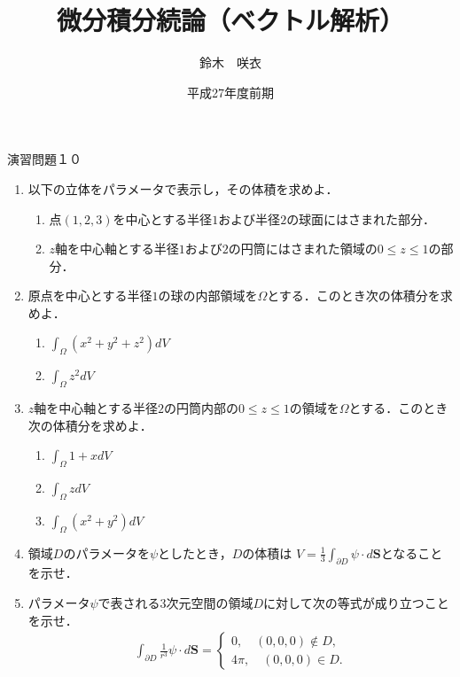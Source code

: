 \documentclass{jarticle}
\begin{document}
\title{微分積分続論（ベクトル解析）} 
\author{鈴木　咲衣}
\date{平成27年度前期}
\maketitle

\begin{center} {\Large 演習問題１０ } \end{center}
\begin{enumerate}
\item \cite[問題5.2]{koba}
以下の立体をパラメータで表示し，その体積を求めよ．
\begin{enumerate}
\item 点$(1,2,3)$を中心とする半径$1$および半径$2$の球面にはさまれた部分．
\item $z$軸を中心軸とする半径$1$および$2$の円筒にはさまれた領域の$0\leq z\leq 1$の部分．
\end{enumerate} 
\item \cite[問題5.5]{koba}
原点を中心とする半径$1$の球の内部領域を$\Omega$とする．このとき次の体積分を求めよ．
\begin{enumerate}
\item $\int_{\Omega} (x^{2}+y^{2}+z^{2}) dV$
\item $\int_{\Omega} z^{2} dV$
\end{enumerate} 
\item \cite[問題5.6]{koba}
$z$軸を中心軸とする半径$2$の円筒内部の$0\leq z\leq 1$の領域を$\Omega$とする．このとき次の体積分を求めよ．
\begin{enumerate}
\item $\int_{\Omega} 1+xdV$
\item $\int_{\Omega} zdV$
\item $\int_{\Omega} (x^{2}+y^{2})dV$
\end{enumerate} 
\item  \cite[問題8.10]{koba}
領域$D$のパラメータを$\psi$としたとき，$D$の体積は
$V=\frac{1}{3}\int_{\partial D} \psi \cdot d\bm S$となることを示せ．
\item \cite[章末問題8.4]{koba}パラメータ$\psi$で表される$3$次元空間の領域$D$に対して次の等式が成り立つことを示せ．
\begin{align*}
\int_{\partial D} \frac{1}{r^{3}} \psi \cdot d \bm S =\begin{cases} 0, \quad (0,0,0) \not \in D,
\\
4\pi, \quad  (0,0,0) \in D.
\end{cases}
\end{align*}
\end{enumerate}
\newpage
\end{document}
